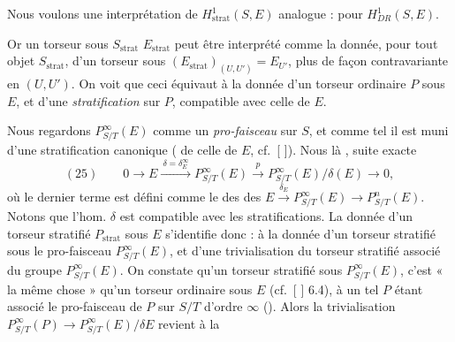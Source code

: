 \documentclass[11pt,a4paper]{article}
\begin{document}
 Nous voulons une interprétation de $H^1_{\mathrm{strat}}(S,E)$
analogue :    pour $H^1_{DR}(S,E)$.


Or un torseur sous $S_{\mathrm{strat}}$  $E_{\mathrm{strat}}$ peut être interprété
comme la donnée, pour tout objet  $S_{\mathrm{strat}}$, d'un
torseur sous $(E_{\mathrm{strat}})_{(U,U')} = E_{U'}$, \struck{\ill{}} plus \ill{} de façon
contravariante en $(U,U')$. On voit que ceci équivaut
à la donnée d'un torseur ordinaire $P$ sous $E$, et
d'une \emph{stratification} sur $P$, compatible avec celle de $E$.

 Nous regardons $P^\infty_{S/T}(E)$ comme un \emph{pro-faisceau}
 sur $S$, et comme tel il est muni d'une stratification
canonique ( de celle de $E$, cf.~[ ]).
Nous  là \struck{\ill{}}, suite exacte
\[
(25)\qquad 0 \longrightarrow E \xrightarrow{\ \delta = \delta^\infty_E\ } P^\infty_{S/T}(E) \xrightarrow{\ p\ } P^\infty_{S/T}(E)/\delta(E) \longrightarrow 0 ,
\]
où le dernier terme est défini comme le 
 des \struck{\ill{}}  des 
$E \xrightarrow{\delta_E} P^\infty_{S/T}(E) \to P^n_{S/T}(E)$.
Notons \struck{\ill{}} que l'hom. $\delta$ est compatible avec les
stratifications. La donnée d'un torseur stratifié $P_{\mathrm{strat}}$
sous $E$ s'identifie donc : à la donnée d'un
torseur stratifié sous le pro-faisceau $P^\infty_{S/T}(E)$, et
d'une trivialisation \struck{\ill{}} du \struck{\ill{}} torseur stratifié associé
du groupe $P^\infty_{S/T}(E)$. On constate qu'un torseur
stratifié sous $P^\infty_{S/T}(E)$, c'est « la même chose » qu'un
torseur ordinaire sous $E$ (cf.~[ ] 6.4), à un
tel $P$ étant associé le pro-faisceau  
 de $P$ sur $S/T$ d'ordre $\infty$ (\ill{}). Alors
la trivialisation $P^\infty_{S/T}(P) \to P^\infty_{S/T}(E)/\delta E$ revient à la
\end{document}
